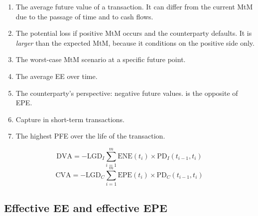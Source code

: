 \begin{enumerate}
\item {} The average future value of a transaction. It can
differ from the current MtM due to the passage of time and to cash flows.
\item {} The potential loss if positive MtM occurs and
the counterparty defaults. It is \emph{larger} than the expected MtM, because it
conditions on the positive side only.
\item {} The worst-case MtM scenario at a
specific future point.
\item {} The average EE over time.
\item {} The counterparty's perspective: negative
future values.  is the opposite of EPE.
\item {} Capture  in
short-term transactions.
\item {} The highest PFE over the life of the transaction.
\end{enumerate}

\begin{crfmlbox}
\[ \mathrm{DVA} = -\mathrm{LGD}_I \sum_{i=1}^{m} \mathrm{ENE}(t_i)\times
   \mathrm{PD}_I(t_{i-1}, t_i) \]
\[ \mathrm{CVA} = -\mathrm{LGD}_C \sum_{i=1}^{m} \mathrm{EPE}(t_i)\times
   \mathrm{PD}_C(t_{i-1}, t_i) \]
\end{crfmlbox}

\subsection*{Effective EE and effective EPE}

